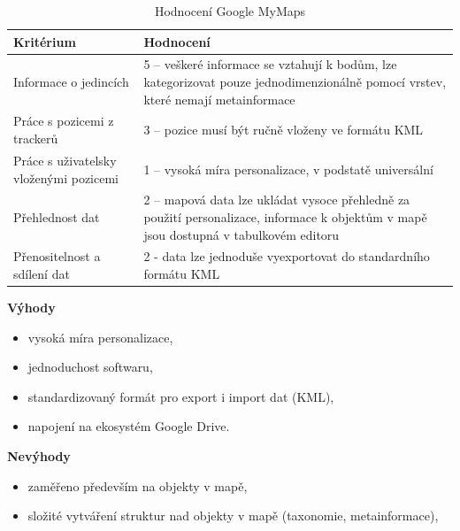 \begin{table}[h]
	\begin{tabular}{ | l | l | }
		\hline
		Kritérium                              & Hodnocení \\
		\hline			
		Informace o jedincích                  & 5 -- veškeré informace se vztahují k bodům, lze kategorizovat pouze jednodimenzionálně pomocí vrstev, které nemají metainformace          \\
		Práce s pozicemi z trackerů            & 3 -- pozice musí být ručně vloženy ve formátu KML          \\
		Práce s uživatelsky vloženými pozicemi & 1 -- vysoká míra personalizace, v podstatě universální          \\
		Přehlednost dat                        & 2 -- mapová data lze ukládat vysoce přehledně za použití personalizace, informace k objektům v mapě jsou dostupná v tabulkovém editoru          \\
		Přenositelnost a sdílení dat           & 2 - data lze jednoduše vyexportovat do standardního formátu KML          \\
		\hline	
	\end{tabular}
	\caption{Hodnocení Google MyMaps}
\end{table}

\textbf{Výhody}

\begin{itemize}
	\item vysoká míra personalizace,
	\item jednoduchost softwaru,
	\item standardizovaný formát pro export i import dat (KML),
	\item napojení na ekosystém Google Drive.
\end{itemize}

\textbf{Nevýhody}

\begin{itemize}
	\item zaměřeno především na objekty v mapě,
	\item složité vytváření struktur nad objekty v mapě (taxonomie, metainformace),
\end{itemize}



